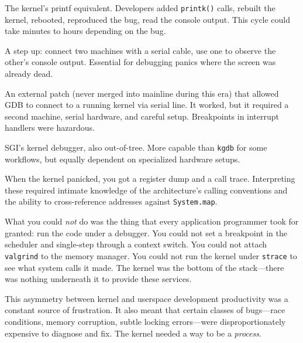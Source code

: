 \begin{description}[leftmargin=2em,labelindent=1em]
  \item[\texttt{printk()}] The kernel's printf equivalent.  Developers added
    \texttt{printk()} calls, rebuilt the kernel, rebooted, reproduced the bug,
    read the console output.  This cycle could take minutes to hours depending on
    the bug.

  \item[Serial console] A step up: connect two machines with a serial cable, use
    one to observe the other's console output.  Essential for debugging panics
    where the screen was already dead.

  \item[\texttt{kgdb}] An external patch (never merged into mainline during this
    era) that allowed GDB to connect to a running kernel via serial line.  It
    worked, but it required a second machine, serial hardware, and careful setup.
    Breakpoints in interrupt handlers were hazardous.

  \item[\texttt{kdb}] SGI's kernel debugger, also out-of-tree.  More capable
    than \texttt{kgdb} for some workflows, but equally dependent on specialized
    hardware setups.

  \item[Crash analysis] When the kernel panicked, you got a register dump and a
    call trace.  Interpreting these required intimate knowledge of the
    architecture's calling conventions and the ability to cross-reference
    addresses against \texttt{System.map}.
\end{description}

\noindent
What you could \emph{not} do was the thing that every application programmer
took for granted: run the code under a debugger.  You could not set a breakpoint
in the scheduler and single-step through a context switch.  You could not attach
\texttt{valgrind} to the memory manager.  You could not run the kernel under
\texttt{strace} to see what system calls it made.  The kernel was the bottom of
the stack---there was nothing underneath it to provide these services.

This asymmetry between kernel and userspace development productivity was a
constant source of frustration.  It also meant that certain classes of bugs---race
conditions, memory corruption, subtle locking errors---were disproportionately
expensive to diagnose and fix.  The kernel needed a way to be a \emph{process}.

